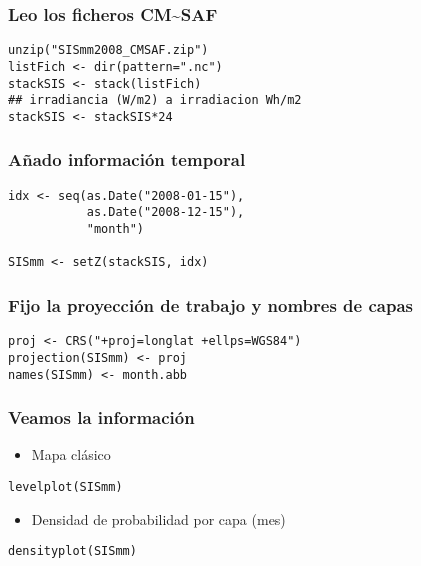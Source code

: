 \documentclass[xcolor={usenames,svgnames,dvipsnames}]{beamer}
\begin{document}
  
\begin{frame}[fragile]
\frametitle{Leo los ficheros CM\~{}SAF}
\label{sec-2-1}


\lstset{language=R}
\begin{lstlisting}
unzip("SISmm2008_CMSAF.zip")
listFich <- dir(pattern=".nc")
stackSIS <- stack(listFich)
## irradiancia (W/m2) a irradiacion Wh/m2
stackSIS <- stackSIS*24
\end{lstlisting}
\end{frame}
\begin{frame}[fragile]
\frametitle{Añado información temporal}
\label{sec-2-2}


\lstset{language=R}
\begin{lstlisting}
idx <- seq(as.Date("2008-01-15"),
           as.Date("2008-12-15"),
           "month")

SISmm <- setZ(stackSIS, idx)
\end{lstlisting}
\end{frame}
\begin{frame}[fragile]
\frametitle{Fijo la proyección de trabajo y nombres de capas}
\label{sec-2-3}


\lstset{language=R}
\begin{lstlisting}
proj <- CRS("+proj=longlat +ellps=WGS84")
projection(SISmm) <- proj
names(SISmm) <- month.abb
\end{lstlisting}
\end{frame}
\begin{frame}[fragile]
\frametitle{Veamos la información}
\label{sec-2-4}

\begin{itemize}
\item Mapa clásico
\end{itemize}

\lstset{language=R}
\begin{lstlisting}
levelplot(SISmm)
\end{lstlisting}
\begin{itemize}
\item Densidad de probabilidad por capa (mes)
\end{itemize}

\lstset{language=R}
\begin{lstlisting}
densityplot(SISmm)
\end{lstlisting}
\end{frame}
\end{document}

